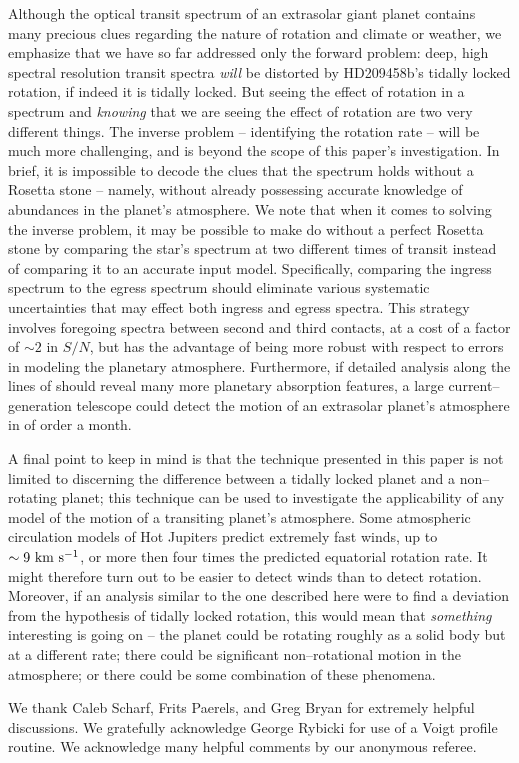 \documentclass[12pt,preprint]{aastex}
\begin{document}
 Although the optical transit spectrum of an extrasolar giant planet contains
many precious clues regarding the nature of rotation and climate or weather, we
emphasize that we have so far addressed only the forward problem: deep,
high spectral resolution transit spectra {\it will} be distorted by
HD209458b's tidally locked rotation, if indeed it is tidally locked.
But seeing the effect of rotation in a spectrum and {\it knowing} that we are
seeing the effect of rotation are two very different things.
The inverse problem -- identifying the rotation rate -- will be much more
challenging, and is beyond the scope of this paper's investigation.
In brief, it is impossible to decode the clues that the spectrum holds
without a Rosetta stone -- namely, without already possessing accurate
knowledge of abundances in the planet's atmosphere.
We note that when it comes to solving the inverse problem, it may be possible
to make do without a perfect Rosetta stone by comparing the star's spectrum
at two different times of transit instead of comparing it to an accurate
input model.  Specifically, comparing the ingress spectrum to the egress
spectrum should eliminate various systematic uncertainties that may effect both
ingress and egress spectra.  This strategy involves foregoing spectra between
second and third contacts, at a cost of a factor of $\sim 2$ in $S/N$, but has
the advantage of being more robust with respect to errors in modeling the
planetary atmosphere. Furthermore, if detailed analysis along the lines of
\citet{charbonneau_et_al2002} should reveal many more planetary absorption
features, a large current--generation telescope could detect the motion of an
extrasolar planet's atmosphere in of order a month.

A final point to keep in mind is that the technique presented in this paper
is not limited to discerning the difference between a tidally locked planet
and a non--rotating planet; this technique can be used to investigate the
applicability of any  model of the motion of a transiting planet's atmosphere.
Some atmospheric circulation models of Hot Jupiters predict extremely fast
winds, up to $\sim 9 {\rm ~km~s^{-1}}$, or more then four times the
predicted equatorial rotation rate.  It might therefore turn out to be easier
to detect winds than to detect rotation.  Moreover, if an analysis similar to
the one described here were to find a deviation from the hypothesis of
tidally locked rotation, this would mean that {\it something} interesting
is going on -- the planet could be rotating roughly as a solid body but at
a different rate; there could be significant non--rotational motion in
the atmosphere; or there could be some combination of these phenomena.




\vspace{\baselineskip}
\vspace{\baselineskip}
We thank Caleb Scharf, Frits Paerels, and Greg Bryan for extremely helpful
discussions.  We gratefully acknowledge George Rybicki for use of a Voigt
profile routine.  We acknowledge many helpful comments by our anonymous
referee.





\end{document}

